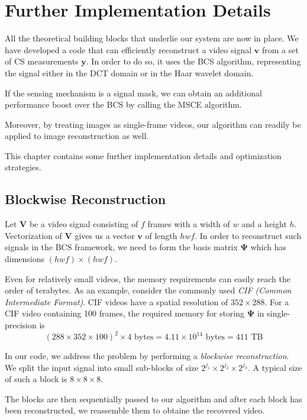 \chapter{Further Implementation Details}
\label{ch:code}
All the theoretical building blocks that underlie our system are now in place.
We have developed a code that can efficiently reconstruct a video signal $\bm v$ from a set of CS measurements $\bm y$.
In order to do so, it uses the BCS algorithm, representing the signal either in the DCT domain or in the Haar wavelet domain.

If the sensing mechanism is a signal mask, we can obtain an additional performance boost over the BCS by calling the MSCE algorithm.

Moreover, by treating images as single-frame videos, our algorithm can readily be applied to image reconstruction as well.

This chapter contains some further implementation details and optimization strategies.

\section{Blockwise Reconstruction}
Let $\bm V$ be a video signal consisting of $f$ frames with a width of $w$ and a height $h$.
Vectorization of $\bm V$ gives us a vector $\bm v$ of length $hwf$.
In order to reconstruct such signals in the BCS framework, we need to form the basis matrix $\bm\Psi$ which has dimensions $(hwf)\times (hwf)$.

Even for relatively small videos, the memory requirements can easily reach the order of terabytes.
As an example, consider the commonly used \emph{CIF (Common Intermediate Format)}.
CIF videos have a spatial resolution of $352 \times 288$.
For a CIF video containing 100 frames, the required memory for storing $\bm\Psi$ in single-precision is
\begin{equation*}
(288\times 352\times 100)^2 \times 4 \mbox{ bytes} = 4.11 \times 10^{14} \mbox{ bytes} = 411 \mbox{ TB}
\end{equation*}

In our code, we address the problem by performing a \emph{blockwise reconstruction}.
We split the input signal into small sub-blocks of size $2^{j_1}\times 2^{j_2}\times 2^{j_3}$.
A typical size of such a block is $8\times 8\times 8$.

The blocks are then sequentially passed to our algorithm and after each block has been reconstructed, we reassemble them to obtaine the recovered video.

